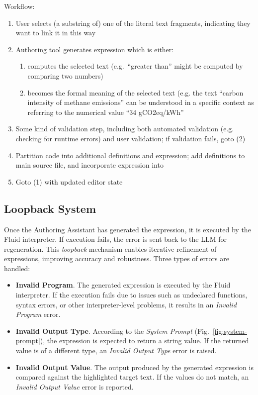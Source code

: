 Workflow:
\begin{enumerate}
\item User selects (a substring of) one of the literal text fragments, indicating they want to link it in this
way
\item Authoring tool generates expression which is either:
  \begin{enumerate}
  \item computes the selected text (e.g.~``greater than'' might be computed by comparing two numbers)
  \item becomes the formal meaning of the selected text (e.g. the text ``carbon intensity of methane
emissions'' can be understood in a specific context as referring to the numerical value ``34 gCO2eq/kWh''
  \end{enumerate}
\item Some kind of validation step, including both automated validation (e.g. checking for runtime errors) and
user validation; if validation fails, goto (2)
\item Partition code into additional definitions and expression; add definitions to main source file, and
incorporate expression into 
\item Goto (1) with updated editor state
\end{enumerate}

\subsection{Loopback System}
\label{subsec:loopback-system}

Once the Authoring Assistant has generated the expression, it is executed by the Fluid interpreter.
If execution fails, the error is sent back to the LLM for regeneration.
This \textit{loopback} mechanism enables iterative refinement of expressions, improving accuracy and robustness.
Three types of errors are handled:

\begin{itemize}
    \item \textbf{Invalid Program}.
    The generated expression is executed by the Fluid interpreter.
    If the execution fails due to issues such as undeclared functions, syntax errors, or other interpreter-level problems, it results in an \textit{Invalid Program} error.
    \item \textbf{Invalid Output Type}.
    According to the \textit{System Prompt} (Fig.~\ref{fig:system-prompt}), the expression is expected to return a string value.
    If the returned value is of a different type, an \textit{Invalid Output Type} error is raised.
    \item \textbf{Invalid Output Value}.
    The output produced by the generated expression is compared against the highlighted target text.
    If the values do not match, an \textit{Invalid Output Value} error is reported.
\end{itemize}

